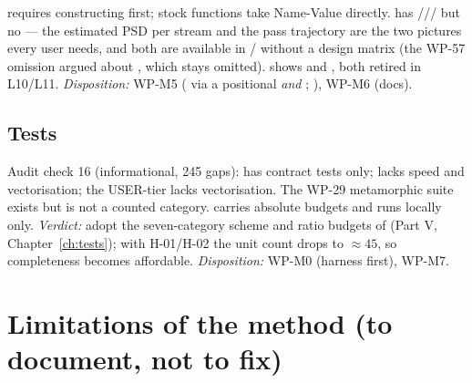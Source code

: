   requires constructing  first; stock functions take Name-Value directly.  has /// but no  --- the estimated PSD per stream and the pass trajectory are the two pictures every user needs, and both are available in / without a design matrix (the WP-57 omission argued about , which stays omitted).  shows  and , both retired in L10/L11. \textit{Disposition:} WP-M5 ( via a positional  \emph{and} ; ), WP-M6 (docs).

\section*{Tests}

 Audit check 16 (informational, 245 gaps):  has contract tests only;  lacks speed and vectorisation; the USER-tier  lacks vectorisation. The WP-29 metamorphic suite exists but is not a counted category.  carries absolute budgets and runs locally only. \textit{Verdict:} adopt the seven-category scheme and ratio budgets of  (Part V, Chapter~\ref{ch:tests}); with H-01/H-02 the unit count drops to $\approx 45$, so completeness becomes affordable. \textit{Disposition:} WP-M0 (harness first), WP-M7.

\chapter{Limitations of the method (to document, not to fix)}
\label{ch:limits}

